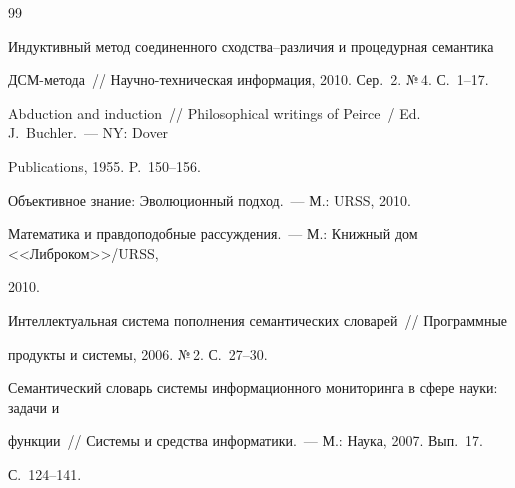{{\begin{thebibliography}{99}




Индуктивный метод соединенного сходства--различия и процедурная семантика 


ДСМ-метода~/\!\!/ Научно-техническая информация, 2010. Сер.~2. №\,4. С.~1--17.









Abduction and induction~/\!\!/ Philosophical writings of Peirce~/ Ed. J.~Buchler.~--- NY: Dover 


Publications, 1955. P.~150--156.









Объективное знание: Эволюционный подход.~--- М.: URSS, 2010.









Математика и правдоподобные рассуждения.~--- М.: Книжный дом <<Либ\-ро\-ком>>/URSS, 


2010. 









Интеллектуальная система пополнения семантических словарей~/\!\!/ Программные 


продукты и системы, 2006. №\,2.  С.~27--30.





 \label{end\stat}









Семантический словарь системы информационного мониторинга в сфере науки: задачи и 


функции~/\!\!/ Системы и средства информатики.~--- М.: Наука, 2007.  Вып.~17.


С.~124--141.


\end{thebibliography}


}


}    


